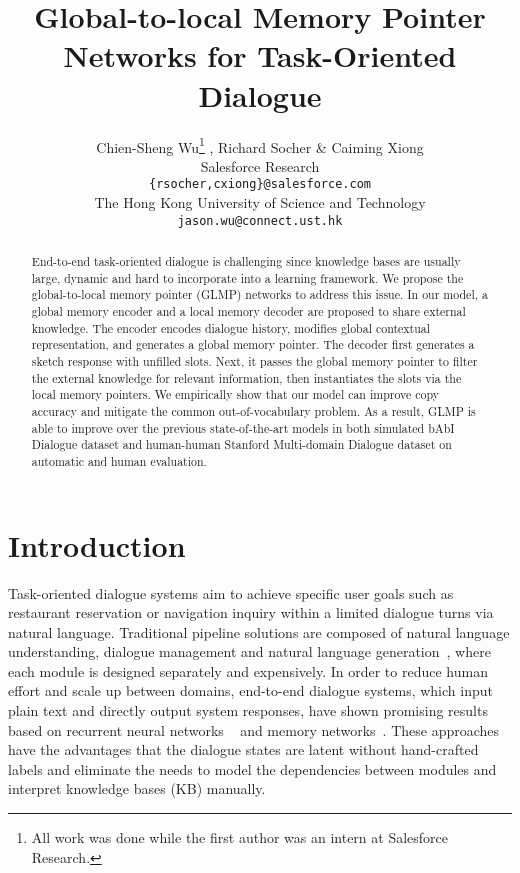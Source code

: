 \documentclass{article} \usepackage{iclr2019_conference,times}
\title{Global-to-local Memory Pointer Networks for Task-Oriented Dialogue}
\author{Chien-Sheng Wu\thanks{All work was done while the first author was an intern at Salesforce Research.} , Richard Socher \& Caiming Xiong \\
Salesforce Research \\
\texttt{\{rsocher,cxiong\}@salesforce.com} \\
The Hong Kong University of Science and Technology \\
\texttt{jason.wu@connect.ust.hk} \\
}
\begin{document}
\maketitle

\begin{abstract}
End-to-end task-oriented dialogue is challenging since knowledge bases are usually large, dynamic and hard to incorporate into a learning framework. We propose the global-to-local memory pointer (GLMP) networks to address this issue. In our model, a global memory encoder and a local memory decoder are proposed to share external knowledge. The encoder encodes dialogue history, modifies global contextual representation, and generates a global memory pointer. The decoder first generates a sketch response with unfilled slots. Next, it passes the global memory pointer to filter the external knowledge for relevant information, then instantiates the slots via the local memory pointers. We empirically show that our model can improve copy accuracy and mitigate the common out-of-vocabulary problem. As a result, GLMP is able to improve over the previous state-of-the-art models in both simulated bAbI Dialogue dataset and human-human Stanford Multi-domain Dialogue dataset on automatic and human evaluation.






\end{abstract}

\section{Introduction}
Task-oriented dialogue systems aim to achieve specific user goals such as restaurant reservation or navigation inquiry within a limited dialogue turns via natural language. Traditional pipeline solutions are composed of natural language understanding, dialogue management and natural language generation~\citep{young2013pomdp,wen2016network}, where each module is designed separately and expensively. In order to reduce human effort and scale up between domains, end-to-end dialogue systems, which input plain text and directly output system responses, have shown promising results based on recurrent neural networks ~\citep{zhao2017generative,lei2018sequicity} and memory networks~\citep{sukhbaatar2015end}. These approaches have the advantages that the dialogue states are latent without hand-crafted labels and eliminate the needs to model the dependencies between modules and interpret knowledge bases (KB) manually.
\end{document}
